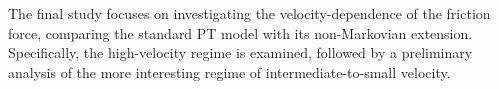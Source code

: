 The final study focuses on investigating the velocity-dependence of the friction force, comparing the standard PT model with its non-Markovian extension. Specifically, the high-velocity regime is examined, followed by a preliminary analysis of the more interesting regime of intermediate-to-small velocity.